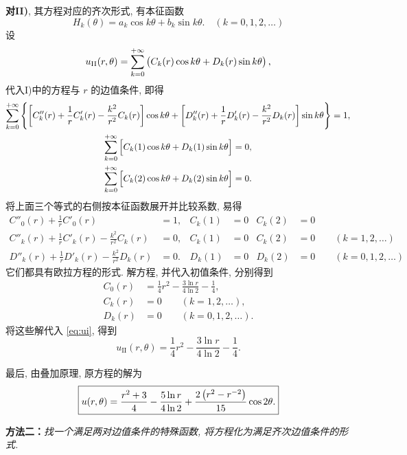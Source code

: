 \begin{solution}
\textbf{对II)}, 其方程对应的齐次形式, 有本征函数
\[
	H_k(\theta) = a_k \cos k\theta + b_k \sin k\theta. \quad (k = 0,1,2,\dotsc)
\]
设
\begin{equation}\label{eq:ui}
	u_{\textrm{II}}(r,\theta) = 
	\sum_{k = 0}^{+\infty} \del[1]{C_k(r) \cos k\theta + D_k(r) \sin k\theta},
\end{equation}
代入I)中的方程与 $r$ 的边值条件, 即得
\begin{gather*}
	\sum_{k = 0}^{+\infty} \set[4]{\sbr[3]{C''_k(r) + \frac 1r C'_k(r) - \frac{k^2}{r^2} C_k(r)} \cos k\theta + \sbr[3]{D''_k(r) + \frac 1r D'_k(r) - \frac{k^2}{r^2} D_k(r)} \sin k\theta} = 1, \\
	\sum_{k = 0}^{+\infty} \sbr[2]{C_k(1) \cos k\theta + D_k(1) \sin k\theta} = 0, \\
	\sum_{k = 0}^{+\infty} \sbr[2]{C_k(2) \cos k\theta + D_k(2) \sin k\theta} = 0.
\end{gather*}
将上面三个等式的右侧按本征函数展开并比较系数, 易得
\begin{align*}
	C''_0(r) + \frac 1r C'_0(r) &= 1, & C_k(1) &=0 & C_k(2) &=0 \\[5pt]
	C''_k(r) + \frac 1r C'_k(r) - \frac{k^2}{r^2} C_k(r) &= 0, & C_k(1) &=0 & C_k(2) &=0 \qquad (k = 1,2,\dotsc)\\[5pt]
	D''_k(r) + \frac 1r D'_k(r) - \frac{k^2}{r^2} D_k(r) &= 0. & D_k(1) &=0 & D_k(2) &=0 \qquad (k = 0,1,2,\dotsc)
\end{align*}
它们都具有欧拉方程的形式. 解方程, 并代入初值条件, 分别得到
\begin{align*}
	C_0(r) &= \frac 14 r^2 - \frac{3\ln r}{4 \ln 2} - \frac 14, \\
	C_k(r) &= 0 \qquad (k = 1,2,\dotsc), \\
	D_k(r) &= 0 \qquad (k = 0,1,2,\dotsc).
\end{align*}
将这些解代入 \eqref{eq:ui}, 得到
\[
	\boxed{u_{\textrm{II}}(r,\theta) = \frac 14 r^2 - \frac{3\ln r}{4 \ln 2} - \frac 14.}
\]

最后, 由叠加原理, 原方程的解为
\[
	\boxed{u(r,\theta) = \frac{r^2 + 3}{4} -\frac{5\ln r}{4 \ln 2} + \frac{2 \del[1]{r^2 - r^{-2}}}{15}\cos 2\theta.}
\]

\textbf{方法二：}\emph{找一个满足两对边值条件的特殊函数, 将方程化为满足齐次边值条件的形式.}


\end{solution}
